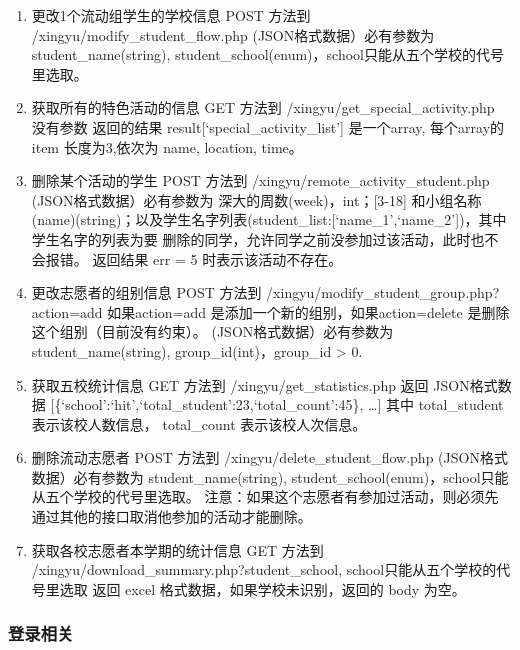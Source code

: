 \documentclass[]{ctexart}
\begin{document}
\begin{enumerate}
\def\labelenumi{\arabic{enumi}.}
\setcounter{enumi}{7}
\item
  更改1个流动组学生的学校信息 POST 方法到
  /xingyu/modify\_student\_flow.php (JSON格式数据）必有参数为
  student\_name(string),
  student\_school(enum)，school只能从五个学校的代号里选取。
\item
  获取所有的特色活动的信息 GET 方法到 /xingyu/get\_special\_activity.php
  没有参数 返回的结果 result{[}`special\_activity\_list'{]} 是一个array,
  每个array的 item 长度为3,依次为 name, location, time。
\item
  删除某个活动的学生 POST 方法到 /xingyu/remote\_activity\_student.php
  (JSON格式数据）必有参数为 深大的周数(week)，int；{[}3-18{]}
  和小组名称(name)(string)；以及学生名字列表(student\_list:{[}`name\_1',`name\_2'{]})，其中学生名字的列表为要
  删除的同学，允许同学之前没参加过该活动，此时也不会报错。 返回结果 err
  = 5 时表示该活动不存在。

\item 更改志愿者的组别信息 POST 方法到
/xingyu/modify\_student\_group.php?action=add 如果action=add
是添加一个新的组别，如果action=delete 是删除这个组别（目前没有约束）。
(JSON格式数据）必有参数为 student\_name(string),
group\_id(int)，group\_id \textgreater{} 0.

\item 获取五校统计信息 GET 方法到 /xingyu/get\_statistics.php 返回
JSON格式数据
{[}\{`school':`hit',`total\_student':23,`total\_count':45\}, \ldots{}{]}
其中 total\_student 表示该校人数信息， total\_count 表示该校人次信息。

\item 删除流动志愿者 POST 方法到 /xingyu/delete\_student\_flow.php
(JSON格式数据）必有参数为 student\_name(string),
student\_school(enum)，school只能从五个学校的代号里选取。
注意：如果这个志愿者有参加过活动，则必须先通过其他的接口取消他参加的活动才能删除。

\item 获取各校志愿者本学期的统计信息 GET 方法到
/xingyu/download\_summary.php?student\_school,
school只能从五个学校的代号里选取 返回 excel
格式数据，如果学校未识别，返回的 body 为空。
\end{enumerate}



\hypertarget{ux767bux5f55ux76f8ux5173}{%
\subsubsection{登录相关}\label{ux767bux5f55ux76f8ux5173}}
\end{document}
